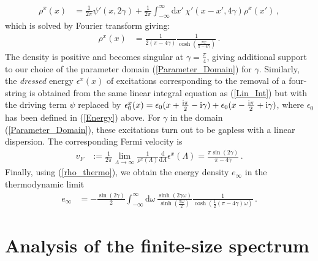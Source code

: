 \documentclass[12pt]{article}
\numberwithin{equation}{section}
\newcommand{\ri}{{\rm i}}
\begin{document}
	
	\begin{align}
		\rho^x(x)&=\frac{1}{2\pi} \psi'(x,2\gamma)+\frac{1}{2\pi}\int^{\infty}_{-\infty}\mathrm{d }x'\, 
		\chi'(x-x',4\gamma)
		\rho^x(x')\,,
		\label{Lin_Int}
	\end{align}
	which is solved by Fourier transform giving: 
	\begin{align}
		\label{rho_thermo}
		\rho^x(x)&=\frac{1}{2(\pi-4\gamma)}\frac{1}{\cosh(\frac{\pi x}{\pi-4\gamma})}\,.
	\end{align}
	The density is positive and becomes singular at $\gamma=\tfrac{\pi}{4}$, giving additional  support to our choice of the parameter domain (\ref{Parameter_Domain}) for $\gamma$. 
	Similarly, the \emph{dressed} energy $\epsilon^x(x)$ of excitations corresponding to  the removal of a four-string is obtained from the same linear integral equation as (\ref{Lin_Int}) but with the driving term $\psi$ replaced by  $\epsilon^x_0(x)=\epsilon_0(x+\frac{\ri \pi}{2}-\ri \gamma)+\epsilon_0(x-\frac{\ri \pi}{2}+\ri \gamma)$, where $\epsilon_0$ has been defined in (\ref{Energy}) above.  For $\gamma$ in the domain (\ref{Parameter_Domain}), these excitations turn out to be gapless with a linear dispersion. The corresponding Fermi velocity is
	\begin{align}
		v_F&:= \frac{1}{2\pi }\lim_{\Lambda\to \infty} \frac{1}{\rho^x(\Lambda)}\frac{\mathrm{d}}{\mathrm{d}\Lambda}\epsilon^x(\Lambda)=\frac{\pi \sin(2\gamma)}{\pi-4\gamma }\,. \label{vF}
	\end{align}
	Finally, using (\ref{rho_thermo}), we obtain the energy density $e_\infty$ in the thermodynamic limit
	\begin{align}
		e_\infty&=-\frac{\sin(2\gamma)}{2}\int^{\infty}_{-\infty}\mathrm{d}\omega  \, \frac{ \sinh (2 \gamma  \omega )}{\sinh \left(\frac{\pi  \omega }{2}\right)} \frac{1}{\cosh(\frac{1}{2} (\pi -4 \gamma ) \omega)} \,. \label{einf}
	\end{align}
	
	
	\section{Analysis of the finite-size spectrum}\label{sec:fsize}
	
\end{document}
